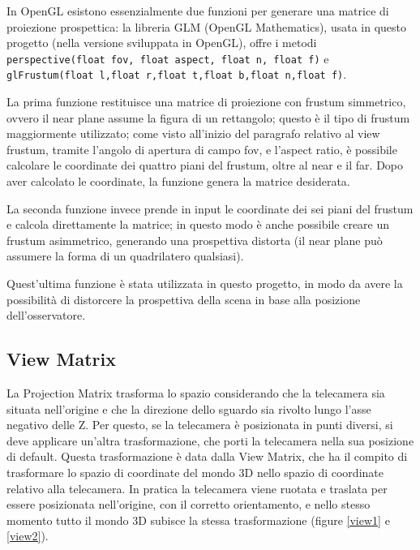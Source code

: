 In OpenGL esistono essenzialmente due funzioni per generare una matrice di proiezione prospettica: la libreria GLM (OpenGL Mathematics), usata in questo progetto (nella versione sviluppata in OpenGL), offre i metodi \texttt{perspective(float fov, float aspect, float n, float f)}
e \texttt{glFrustum(float l,float r,float t,float b,float n,float f)}.

La prima funzione restituisce una matrice di proiezione con frustum simmetrico, ovvero il near plane assume la figura di un rettangolo; questo è il tipo di frustum maggiormente utilizzato; come visto all'inizio del paragrafo relativo al view frustum, tramite l'angolo di apertura di campo fov, e l'aspect ratio, è possibile calcolare le coordinate dei quattro piani del frustum, oltre al near e il far. Dopo aver calcolato le coordinate, la funzione genera la matrice desiderata.

La seconda funzione invece prende in input le coordinate dei sei piani del frustum e calcola direttamente la matrice; in questo modo è anche possibile creare un frustum asimmetrico, generando una prospettiva distorta (il near plane può assumere la forma di un quadrilatero qualsiasi).

Quest'ultima funzione è stata utilizzata in questo progetto, in modo da avere la possibilità di distorcere la prospettiva della scena in base alla posizione dell'osservatore.  

\subsection{View Matrix}
La Projection Matrix trasforma lo spazio considerando che la telecamera sia situata nell'origine e che la direzione dello sguardo sia rivolto lungo l'asse negativo delle Z. Per questo, se la telecamera è posizionata in punti diversi, si deve applicare un'altra trasformazione, che porti la telecamera nella sua posizione di default. Questa trasformazione è data dalla View Matrix, che ha il compito di trasformare lo spazio di coordinate del mondo 3D nello spazio di coordinate relativo alla telecamera. In pratica la telecamera viene ruotata e traslata per essere posizionata nell'origine, con il corretto orientamento, e nello stesso momento tutto il mondo 3D subisce la stessa trasformazione (figure \ref{view1} e \ref{view2}).

